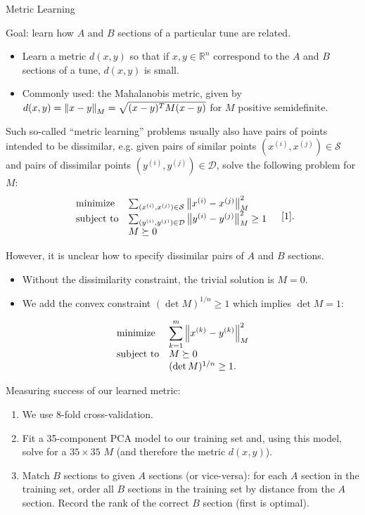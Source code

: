 \documentclass[letterpaper]{amsart}
\begin{document}
\begin{center}
\Huge
Metric Learning
\end{center}
\huge
Goal: learn how $A$ and $B$ sections of a particular tune are related.
\begin{itemize}
\item Learn a metric $d(x,y)$ so that if $x, y \in \mathbb R^n$ correspond to the $A$ and $B$ sections of a tune, $d(x,y)$ is small.

\item Commonly used: the Mahalanobis metric, given by $d(x,y) = \left\lVert x-y\right\rVert_M = \sqrt{(x-y)^T M (x-y)}$ for $M$ positive semidefinite.

\end{itemize}

Such so-called ``metric learning'' problems usually also have pairs of points intended to be dissimilar, e.g. given pairs of similar points $(x^{(i)}, x^{(j)}) \in \mathcal S$ and pairs of dissimilar points $(y^{(i)}, y^{(j)}) \in \mathcal D$, solve the following problem for $M$:
\[
    \begin{array}{ll}
        \text{minimize} & \sum_{(x^{(i)}, x^{(j)}) \in \mathcal S} \left\lVert x^{(i)} - x^{(j)}\right\rVert_M^2 \\
        \text{subject to} & \sum_{(y^{(i)}, y^{(j)}) \in \mathcal D} \left\lVert y^{(i)} - y^{(j)}\right\rVert_M^2\geq1\\
        & M \succeq 0
    \end{array}\quad [1].
\]

However, it is unclear how to specify dissimilar pairs of $A$ and $B$ sections.
\begin{itemize}
\item Without the dissimilarity constraint, the trivial solution is $M=0$.

\item We add the convex constraint $(\det M)^{1/n} \geq 1$ which implies $\det M = 1$:
\end{itemize}
\[
    \begin{array}{ll}
        \text{minimize} & \displaystyle{\sum_{k=1}^m \left\lVert x^{(k)} - y^{(k)}\right\rVert_M^2} \\
        \text{subject to} & M \succeq 0 \\
        & (\det M)^{1/n} \geq 1.
    \end{array}
\]

\newpage

Measuring success of our learned metric:
\begin{enumerate}
\item We use 8-fold cross-validation.

\item Fit a 35-component PCA model to our training set and, using this model, solve for a $35\times35$ $M$ (and therefore the metric $d(x,y)$).

\item Match $B$ sections to given $A$ sections (or vice-versa): for each $A$ section in the training set, order all $B$ sections in the training set by distance from the $A$ section. Record the rank of the correct $B$ section (first is optimal).

\end{enumerate}
\end{document}
